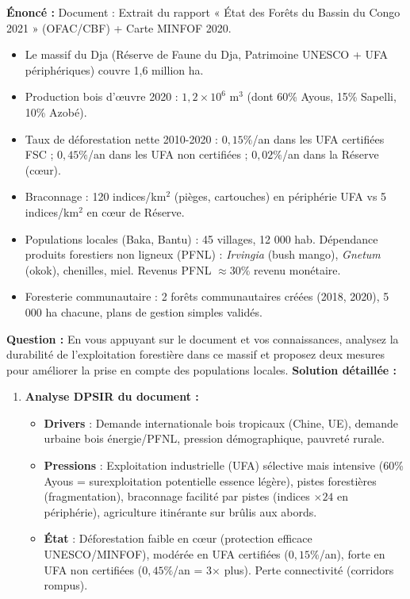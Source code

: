 \documentclass[11pt]{article}
\begin{document}
\begin{exoresolu}
    \textbf{Énoncé :} Document : Extrait du rapport « État des Forêts du Bassin du Congo 2021 » (OFAC/CBF) + Carte MINFOF 2020.
    \begin{itemize}
        \item Le massif du Dja (Réserve de Faune du Dja, Patrimoine UNESCO + UFA périphériques) couvre 1,6 million ha.
        \item Production bois d'œuvre 2020 : $1,2 \times 10^6$ m$^3$ (dont 60\% Ayous, 15\% Sapelli, 10\% Azobé).
        \item Taux de déforestation nette 2010-2020 : $0,15\%$/an dans les UFA certifiées FSC ; $0,45\%$/an dans les UFA non certifiées ; $0,02\%$/an dans la Réserve (cœur).
        \item Braconnage : 120 indices/km$^2$ (pièges, cartouches) en périphérie UFA vs 5 indices/km$^2$ en cœur de Réserve.
        \item Populations locales (Baka, Bantu) : 45 villages, 12 000 hab. Dépendance produits forestiers non ligneux (PFNL) : \emph{Irvingia} (bush mango), \emph{Gnetum} (okok), chenilles, miel. Revenus PFNL $\approx 30\%$ revenu monétaire.
        \item Foresterie communautaire : 2 forêts communautaires créées (2018, 2020), 5 000 ha chacune, plans de gestion simples validés.
    \end{itemize}
    \textbf{Question :} En vous appuyant sur le document et vos connaissances, analysez la durabilité de l'exploitation forestière dans ce massif et proposez deux mesures pour améliorer la prise en compte des populations locales.
    \tcblower
    \textbf{Solution détaillée :}
    \begin{enumerate}
        \item \textbf{Analyse DPSIR du document :}
        \begin{itemize}
            \item \textbf{Drivers} : Demande internationale bois tropicaux (Chine, UE), demande urbaine bois énergie/PFNL, pression démographique, pauvreté rurale.
            \item \textbf{Pressions} : Exploitation industrielle (UFA) sélective mais intensive (60\% Ayous = surexploitation potentielle essence légère), pistes forestières (fragmentation), braconnage facilité par pistes (indices $\times 24$ en périphérie), agriculture itinérante sur brûlis aux abords.
            \item \textbf{État} : Déforestation faible en cœur (protection efficace UNESCO/MINFOF), modérée en UFA certifiées ($0,15\%$/an), forte en UFA non certifiées ($0,45\%$/an = 3$\times$ plus). Perte connectivité (corridors rompus).

\end{itemize}
\end{enumerate}
\end{exoresolu}
\end{document}
